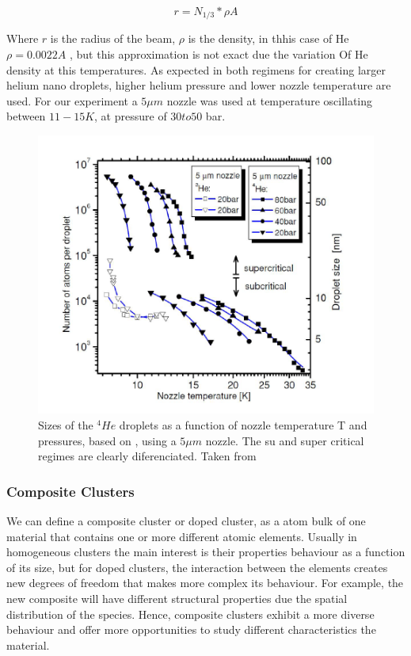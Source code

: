 \begin{equation}
r=N_{1/3} * \rho A
\end{equation}

Where $r$ is the radius of the beam, $\rho$ is the density, in thhis case of He $\rho =0.0022 A $ \cite{stringari_systematics_1987}, but this approximation is not exact due the variation Of He density at this temperatures. As expected in both regimens for creating larger helium nano droplets, higher helium pressure and lower nozzle temperature are used. For our experiment a $5 \mu m$ nozzle was used at temperature oscillating between $11-15 K$, at pressure of $30 to 50$ bar.

\begin{figure}[hbtp]
\centering
\label{img:dropletSize}
\includegraphics[scale=0.4]{../Images/sizes_regimen.PNG}
\caption[Expantion droplets Regimens]{Sizes of the $^{4}He$ droplets  as a function of nozzle temperature T and  pressures, based on \cite{toennies_spectroscopy_1998}, using a $5 \mu m$ nozzle. The su and super critical regimes are clearly diferenciated. Taken from \cite{stienkemeier_spsectroscopy_2006}}
\end{figure}


\subsubsection{Composite Clusters}

We can define a composite cluster or doped cluster, as a atom  bulk of one material that contains one or more different atomic elements. Usually in homogeneous clusters the main interest is their properties behaviour as a function of its size, but for doped clusters, the interaction between the elements creates new degrees of freedom that makes more complex its behaviour. For example, the new composite will have different structural properties due the spatial distribution of the species. Hence, composite clusters exhibit a more diverse behaviour and offer more opportunities to study different characteristics the material.


